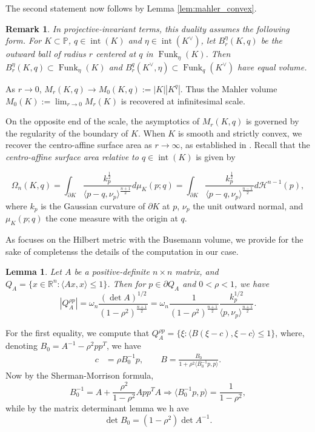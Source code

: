 \documentclass[reqno,10pt]{amsart}
\newcounter{mp}
\newtheorem{Lemma}[Proposition]{Lemma}
\newtheorem{Remark}[Proposition]{Remark}
\DeclareMathOperator{\inter}{int}
\DeclareMathOperator{\Funk}{Funk}
\newcommand{\R}{\mathbb{R}}
\newcommand{\PP}{\mathbb{P}}
\begin{document}
The second statement now follows by Lemma \ref{lem:mahler_convex}.
\endproof
\begin{Remark}
In projective-invariant terms, this duality assumes the following form. For $K\subset\PP$, $q\in \inter(K)$ and $\eta\in\inter(K^\vee)$, let $B^\eta_r(K, q)$ be the outward ball of radius $r$ centered at $q$ in $\Funk_\eta(K)$. Then $B^\eta_r(K, q)\subset \Funk_\eta(K)$ and $B_r^q(K^\vee, \eta)\subset \Funk_q(K^\vee)$ have equal volume.
\end{Remark}

As $r\to0$, $M_r(K,q)\to M_0(K,q):=|K||K^q|$. Thus the Mahler volume $M_0(K):=\lim_{r\to 0} M_r(K)$ is recovered at infinitesimal scale.

On the opposite end of the scale, the asymptotics of $M_r(K,q)$ is governed by the regularity of the boundary of $K$. When $K$ is smooth and strictly convex, we recover the centro-affine surface area as $r\to\infty$, as established in \cite{berck_bernig_vernicos}. Recall that the \emph{centro-affine surface area relative to $q\in \inter(K)$} is given by 

\begin{equation}\label{eq:centro_affine}\Omega_n(K, q)=\int_{\partial K}\frac{k_p^{\frac 12}}{\langle p-q, \nu_p\rangle^{\frac{n+1}{2}}}d\mu_K(p;q)=\int_{\partial K}\frac{k_p^{\frac 12}}{\langle p-q, \nu_p\rangle^{\frac{n-1}{2}}}d\mathcal H^{n-1}(p),\end{equation}
where $k_p$ is the Gaussian curvature of $\partial K$ at $p$, $\nu_p$ the unit outward normal, and $\mu_K(p;q)$ the cone measure with the origin at $q$.

As \cite{berck_bernig_vernicos} focuses on the Hilbert metric with the Busemann volume, we provide for the sake of completenss the details of the computation in our case.

\begin{Lemma}\label{lem:volume_ellipsoid}
	Let $A$ be a positive-definite $n\times n$ matrix, and $Q_A=\{x\in\R^n:\langle Ax, x\rangle \leq 1\}$. Then for $p\in\partial Q_A$ and $0<\rho <1$, we have 
	$$|Q_A^{\rho p}|=\omega_n\frac{(\det A)^{1/2}}{(1-\rho^2)^{\frac{n+1}{2}}}=\omega_n\frac{1}{(1-\rho^2)^{\frac{n+1}{2}}}\frac{k_p^{1/2}}{\langle p,\nu_p\rangle^{\frac{n+1}{2}}}.$$ 
\end{Lemma}
\proof
For the first equality, we compute that $Q_A^{\rho p}=\{ \xi: \langle B(\xi-c),\xi-c\rangle\leq 1\}$, where, denoting $B_0=A^{-1}-\rho^2pp^T$, we have 
\begin{align*}c&=\rho B_0^{-1}p, \qquad B=\frac{B_0}{1+\rho^2\langle B_0^{-1}p,p\rangle}.
\end{align*}
Now by the Sherman-Morrison formula, $$B_0^{-1}=A+\frac{\rho^2}{1-\rho^2}App^TA\Rightarrow  \langle B_0^{-1}p,p\rangle =\frac{1}{1-\rho^2},$$ while by the matrix determinant lemma we h	ave
$$\det B_0 =(1-\rho^2)\det A^{-1}.$$
\end{document}
